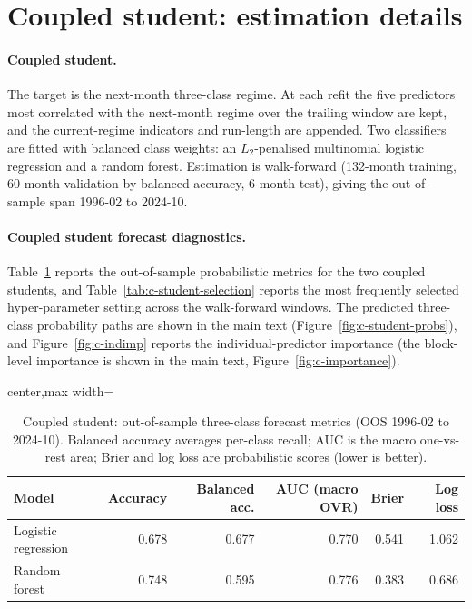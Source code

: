 \FloatBarrier

\section{Coupled student: estimation details}
\label{app:student-coupled}

\paragraph{Coupled student.} The target is the next-month three-class regime. At each refit
the five predictors most correlated with the next-month regime over the trailing window are
kept, and the current-regime indicators and run-length are appended. Two classifiers are
fitted with balanced class weights: an $L_2$-penalised multinomial logistic regression and a
random forest. Estimation is walk-forward (132-month training, 60-month validation by
balanced accuracy, 6-month test), giving the out-of-sample span 1996-02 to 2024-10.

\paragraph{Coupled student forecast diagnostics.}
Table~\ref{tab:c-student-metrics} reports the out-of-sample probabilistic metrics for the two
coupled students, and Table~\ref{tab:c-student-selection} reports the most frequently selected
hyper-parameter setting across the walk-forward windows. The predicted three-class
probability paths are shown in the main text (Figure~\ref{fig:c-student-probs}), and
Figure~\ref{fig:c-indimp} reports the
individual-predictor importance (the block-level importance is shown in the main text,
Figure~\ref{fig:c-importance}).

\begin{table}[H]
\centering
\caption{Coupled student: out-of-sample three-class forecast metrics (OOS 1996-02 to
2024-10). Balanced accuracy averages per-class recall; AUC is the macro one-vs-rest area;
Brier and log loss are probabilistic scores (lower is better).}
\label{tab:c-student-metrics}
\small
\begin{adjustbox}{center,max width=\linewidth}
\begin{tabular}{lrrrrr}
\toprule
Model & Accuracy & Balanced acc. & AUC (macro OVR) & Brier & Log loss \\
\midrule
Logistic regression & 0.678 & 0.677 & 0.770 & 0.541 & 1.062 \\
Random forest       & 0.748 & 0.595 & 0.776 & 0.383 & 0.686 \\
\bottomrule
\end{tabular}
\end{adjustbox}
\end{table}

